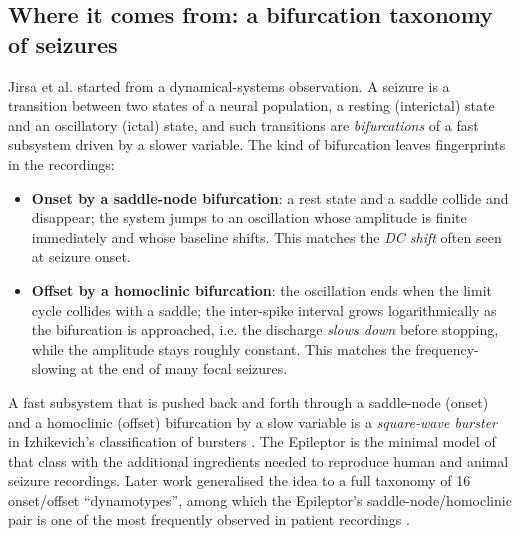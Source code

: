 \documentclass[11pt]{article}
\begin{document}
\subsection{Where it comes from: a bifurcation taxonomy of seizures}
Jirsa et al. \cite{jirsa2014} started from a dynamical-systems observation. A seizure is a transition between
two states of a neural population, a resting (interictal) state and an oscillatory (ictal) state, and such
transitions are \emph{bifurcations} of a fast subsystem driven by a slower variable. The kind of bifurcation leaves
fingerprints in the recordings:
\begin{itemize}
\item \textbf{Onset by a saddle-node bifurcation}: a rest state and a saddle collide and disappear; the system jumps to
an oscillation whose amplitude is finite immediately and whose baseline shifts. This matches the \emph{DC shift}
often seen at seizure onset.
\item \textbf{Offset by a homoclinic bifurcation}: the oscillation ends when the limit cycle collides with a saddle;
the inter-spike interval grows logarithmically as the bifurcation is approached, i.e. the discharge
\emph{slows down} before stopping, while the amplitude stays roughly constant. This matches the
frequency-slowing at the end of many focal seizures.
\end{itemize}
A fast subsystem that is pushed back and forth through a saddle-node (onset) and a homoclinic (offset) bifurcation
by a slow variable is a \emph{square-wave burster} in Izhikevich's classification of bursters \cite{izhikevich2000}.
The Epileptor is the minimal model of that class with the additional ingredients needed to reproduce human and animal
seizure recordings. Later work generalised the idea to a full taxonomy of 16 onset/offset ``dynamotypes'', among which
the Epileptor's saddle-node/homoclinic pair is one of the most frequently observed in patient recordings \cite{saggio2020}.
\end{document}
